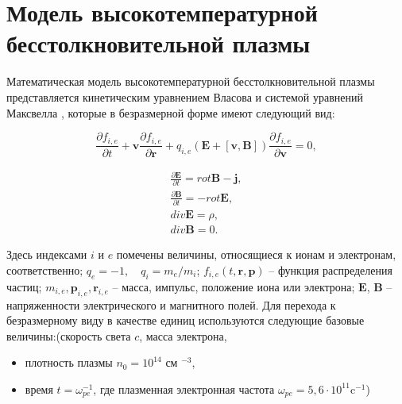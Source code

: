 \section{Модель высокотемпературной бесстолкновительной плазмы}

Математическая модель высокотемпературной бесстолкновительной плазмы
представляется кинетическим уравнением Власова и системой
уравнений Максвелла \cite{VshivkovPICbook,birdsall2004plasma}, которые в безразмерной форме имеют
следующий вид:

\begin{equation}\label{eq:Vlas}
\frac{\partial f_{i,e}}{\partial t}+{\textbf{v}} \frac{\partial f_{i,e}}{\partial \textbf{r}}+q_{i,e}({\textbf{E}}+[{\textbf{v}},{\textbf{B}}])\frac{\partial f_{i,e}}{\partial \textbf{v}}=0, 
\end{equation}

\begin{eqnarray}
& \frac{\partial \textbf{E}}{\partial t}=rot \textbf{B} - \textbf{j}, & \label{eq:dE}
\\
& \frac{\partial \textbf{B}}{\partial t}=-rot \textbf{E}, & \label{eq:dB}
\\
& div \textbf{E} = \rho, & \label{eq:divE}
\\
& div \textbf{B} = 0. & \label{eq:divB}
\end{eqnarray}

Здесь индексами $i$ и $e$ помечены величины, относящиеся к ионам и
электронам, со\-от\-ветст\-вен\-но; $q_e=-1, \quad q_i=m_e/m_i$; $f_{i,e}(t,\textbf{r},\textbf{p})$ --
функция распределения частиц; $m_{i,e}, \textbf{p}_{i,e},
\textbf{r}_{i,e}$ -- масса, импульс, положение иона или электрона;
$\textbf{E}$, $\textbf{B}$ -- напряженности электрического и магнитного
полей. Для перехода к безразмерному виду в качестве единиц
используются следующие базовые величины:(скорость света $c$, масса электрона,
\begin{itemize}
\item плотность плазмы $n_0=10^{14}$ см $^{-3}$,
\item время $t=\omega _{pe}^{-1}$, где плазменная электронная частота $\omega_{pe} =5,6 \cdot 10^{11}$c$^{-1}$)
\end{itemize}

%
%
% 	


